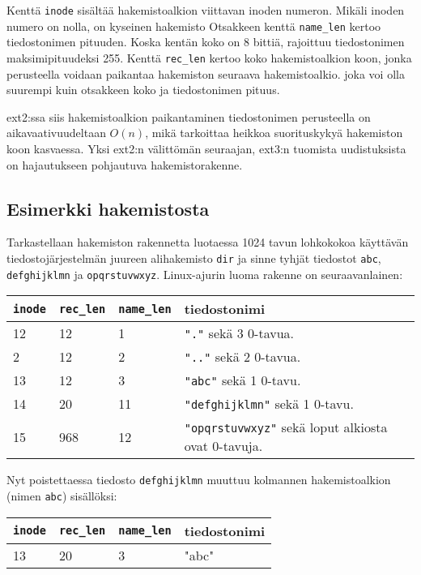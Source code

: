 Kenttä \texttt{inode} sisältää hakemistoalkion viittavan inoden numeron.
Mikäli inoden numero on nolla, on kyseinen hakemisto
Otsakkeen kenttä \texttt{name\_len} kertoo tiedostonimen pituuden.
Koska kentän koko on 8 bittiä, rajoittuu tiedostonimen maksimipituudeksi 255.
Kenttä \texttt{rec\_len} kertoo koko hakemistoalkion koon,
jonka perusteella voidaan paikantaa hakemiston seuraava hakemistoalkio.
joka voi olla suurempi kuin otsakkeen koko ja tiedostonimen pituus.

ext2:ssa siis hakemistoalkion paikantaminen tiedostonimen perusteella on aikavaativuudeltaan $O(n)$,
mikä tarkoittaa heikkoa suorituskykyä hakemiston koon kasvaessa.
Yksi ext2:n välittömän seuraajan, ext3:n tuomista uudistuksista on hajautukseen pohjautuva hakemistorakenne.

\subsection{Esimerkki hakemistosta}
Tarkastellaan hakemiston rakennetta luotaessa 1024 tavun lohkokokoa käyttävän tiedostojärjestelmän juureen alihakemisto \texttt{dir} ja sinne tyhjät tiedostot \texttt{abc}, \texttt{defghijklmn} ja \texttt{opqrstuvwxyz}.
Linux-ajurin luoma rakenne on seuraavanlainen:

\begin{tabular}{llll}
    \texttt{inode} & \texttt{rec\_len} & \texttt{name\_len} & tiedostonimi \\ \hline
    12 & 12  & 1  & \texttt{"."}            sekä 3 0-tavua. \\
    2  & 12  & 2  & \texttt{".."}           sekä 2 0-tavua. \\
    13 & 12  & 3  & \texttt{"abc"}          sekä 1 0-tavu. \\
    14 & 20  & 11 & \texttt{"defghijklmn"}  sekä 1 0-tavu. \\
    15 & 968 & 12 & \texttt{"opqrstuvwxyz"} sekä loput alkiosta ovat 0-tavuja. \\
\end{tabular}

Nyt poistettaessa tiedosto \texttt{defghijklmn} muuttuu kolmannen hakemistoalkion (nimen \texttt{abc}) sisällöksi:

\begin{tabular}{llll}
    \texttt{inode} & \texttt{rec\_len} & \texttt{name\_len} & tiedostonimi \\ \hline
    13 & 20  & 3  & "abc"\\
\end{tabular}

